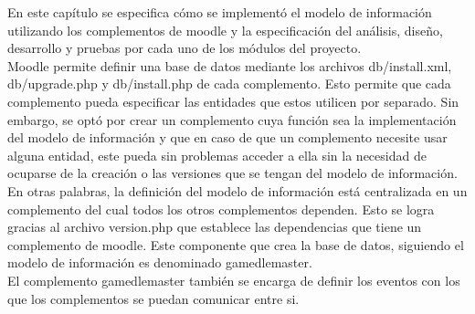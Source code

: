 %






%
%
%

En este capítulo se especifica cómo se implementó el modelo de información utilizando los complementos de moodle
y la especificación del análisis, diseño, desarrollo y pruebas
por cada uno de los módulos del proyecto. \\

\noindent Moodle permite definir una base de datos mediante los archivos db/install.xml, db/upgrade.php y db/install.php de cada complemento.
Esto permite que cada complemento pueda especificar las entidades que estos utilicen por separado.
Sin embargo, se optó por crear un complemento cuya función sea la implementación del modelo de información
y que en caso de que un complemento necesite usar alguna entidad, este pueda sin problemas acceder a ella
sin la necesidad de ocuparse de la creación o las versiones que se tengan
del modelo de información.\\

\noindent En otras palabras, la definición del modelo de información está centralizada en
un complemento del cual todos los otros complementos dependen. Esto se logra gracias al archivo version.php que establece
las dependencias que tiene un complemento de moodle. Este componente que crea la base de datos,
siguiendo el modelo de información es denominado gamedlemaster.\\

\noindent El complemento gamedlemaster también se encarga de definir
los eventos con los que los complementos se puedan comunicar entre si.
